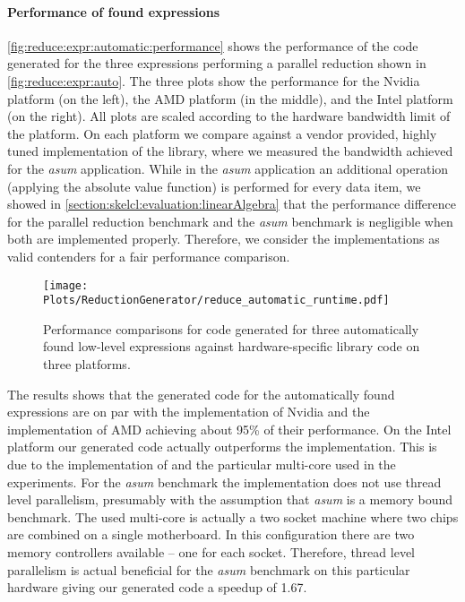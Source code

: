 \paragraph{Performance of found expressions}
\autoref{fig:reduce:expr:automatic:performance} shows the performance of the code generated for the three expressions performing a parallel reduction shown in \autoref{fig:reduce:expr:auto}.
The three plots show the performance for the Nvidia platform (on the left), the AMD platform (in the middle), and the Intel platform (on the right).
All plots are scaled according to the hardware bandwidth limit of the platform.
On each platform we compare against a vendor provided, highly tuned implementation of the \BLAS library, where we measured the bandwidth achieved for the \emph{asum} application.
While in the \emph{asum} application an additional operation (applying the absolute value function) is performed for every data item, we showed in \autoref{section:skelcl:evaluation:linearAlgebra} that the performance difference for the parallel reduction benchmark and the \emph{asum} benchmark is negligible when both are implemented properly.
Therefore, we consider the \BLAS implementations as valid contenders for a fair performance comparison.

\begin{figure}
  \centering
  \texttt{[image: Plots/ReductionGenerator/reduce\_automatic\_runtime.pdf]}
  \caption{Performance comparisons for code generated for three automatically found low-level expressions against hardware-specific library code on three platforms.}
  \label{fig:reduce:expr:automatic:performance}
\end{figure}

The results shows that the generated code for the automatically found expressions are on par with the \CUBLAS implementation of Nvidia and the \clBLAS implementation of AMD achieving about 95\% of their performance.
On the Intel platform our generated code actually outperforms the \MKL implementation.
This is due to the implementation of \MKL and the particular multi-core \CPU used in the experiments.
For the \emph{asum} benchmark the \MKL implementation does not use thread level parallelism, presumably with the assumption that \emph{asum} is a memory bound benchmark.
The used multi-core \CPU is actually a two socket machine where two chips are combined on a single motherboard.
In this configuration there are two memory controllers available -- one for each socket.
Therefore, thread level parallelism is actual beneficial for the \emph{asum} benchmark on this particular hardware giving our generated code a speedup of 1.67.

